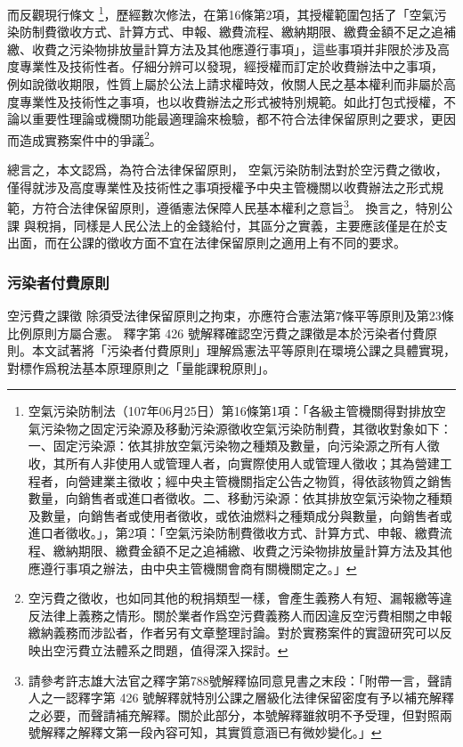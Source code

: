 \documentclass[12pt,a4paper]{article}
\begin{document}
而反觀現行條文
\footnote{空氣污染防制法（107年06月25日）第16條第1項：「各級主管機關得對排放空氣污染物之固定污染源及移動污染源徵收空氣污染防制費，其徵收對象如下：一、固定污染源：依其排放空氣污染物之種類及數量，向污染源之所有人徵收，其所有人非使用人或管理人者，向實際使用人或管理人徵收；其為營建工程者，向營建業主徵收；經中央主管機關指定公告之物質，得依該物質之銷售數量，向銷售者或進口者徵收。二、移動污染源：依其排放空氣污染物之種類及數量，向銷售者或使用者徵收，或依油燃料之種類成分與數量，向銷售者或進口者徵收。」，第2項：「空氣污染防制費徵收方式、計算方式、申報、繳費流程、繳納期限、繳費金額不足之追補繳、收費之污染物排放量計算方法及其他應遵行事項之辦法，由中央主管機關會商有關機關定之。」}，歷經數次修法，在第16條第2項，其授權範圍包括了「空氣污染防制費徵收方式、計算方式、申報、繳費流程、繳納期限、繳費金額不足之追補繳、收費之污染物排放量計算方法及其他應遵行事項」，這些事項并非限於涉及高度專業性及技術性者。仔細分辨可以發現，經授權而訂定於收費辦法中之事項，
例如說徵收期限，性質上屬於公法上請求權時效，攸關人民之基本權利而非屬於高度專業性及技術性之事項，也以收費辦法之形式被特別規範。如此打包式授權，不論以重要性理論或機關功能最適理論來檢驗，都不符合法律保留原則之要求，更因而造成實務案件中的爭議\footnote{空污費之徵收，也如同其他的稅捐類型一樣，會產生義務人有短、漏報繳等違反法律上義務之情形。關於業者作爲空污費義務人而因違反空污費相關之申報繳納義務而涉訟者，作者另有文章整理討論。對於實務案件的實證研究可以反映出空污費立法體系之問題，值得深入探討。}。


總言之，本文認爲，為符合法律保留原則，
空氣污染防制法對於空污費之徵收，僅得就涉及高度專業性及技術性之事項授權予中央主管機關以收費辦法之形式規範，方符合法律保留原則，遵循憲法保障人民基本權利之意旨\footnote{請參考許志雄大法官之釋字第788號解釋協同意見書之末段：「附帶一言，聲請人之一認釋字第 426 號解釋就特別公課之層級化法律保留密度有予以補充解釋之必要，而聲請補充解釋。關於此部分，本號解釋雖敘明不予受理，但對照兩號解釋之解釋文第一段內容可知，其實質意涵已有微妙變化。」}。
換言之，特別公課 與稅捐，同樣是人民公法上的金錢給付，其區分之實義，主要應該僅是在於支出面，而在公課的徵收方面不宜在法律保留原則之適用上有不同的要求。

\subsubsection{污染者付費原則}
空污費之課徵
除須受法律保留原則之拘束，亦應符合憲法第7條平等原則及第23條比例原則方屬合憲。
釋字第 426 號解釋確認空污費之課徵是本於污染者付費原則。本文試著將「污染者付費原則」理解爲憲法平等原則在環境公課之具體實現，對標作爲稅法基本原理原則之「量能課稅原則」。
\end{document}
